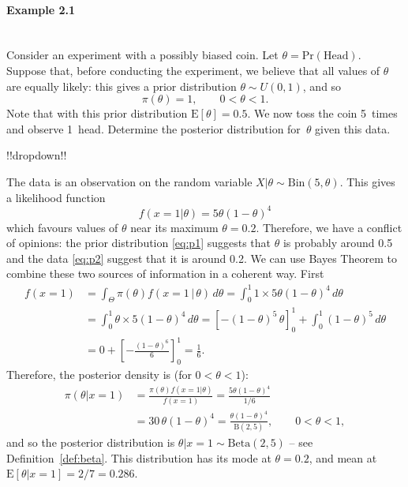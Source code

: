 \paragraph{Example 2.1}{~\\
Consider an experiment with a possibly biased coin. Let
\label{ex:coin}
$\theta=\text{Pr}(\mathrm{Head})$. Suppose that, before conducting the experiment, we believe that all values of $\theta$ are equally likely: this gives a prior distribution $\theta\sim U(0,1)$, and so
\begin{equation} 
\pi(\theta)=1,\quad\quad0<\theta<1.
\label{eq:p1}
\end{equation}
Note that with this prior distribution $\text{E}[\theta]=0.5$. We now toss the coin 5~times and observe 1~head. Determine the posterior distribution for~$\theta$ given this data.

!!dropdown!!

The data is an observation on the random variable $X|\theta\sim
        \mathrm{Bin}(5,\theta)$. This gives a likelihood function
        \begin{equation}
        f(x=1|\theta)=5\theta(1-\theta)^4
        \label{eq:p2}
        \end{equation}
        which favours values of $\theta$ near its maximum
        $\theta=0.2$. Therefore, we have a conflict of opinions: the prior
        distribution \eqref{eq:p1} suggests that $\theta$ is probably around
        0.5 and the data \eqref{eq:p2} suggest that it is around 0.2. We can
        use Bayes Theorem to combine these two sources of information in a
        coherent way. First
        \begin{align*}
        f(x=1) &=\int_\Theta\pi(\theta)f(x=1\, |\,\theta)\,d\theta = \int_0^1 1\times 5\theta(1-\theta)^4\,d\theta \\
        &=\int_0^1 \theta\times 5(1-\theta)^4\,d\theta =\left[-(1-\theta)^5\,\theta\right]^1_0
        +\int_0^1 (1-\theta)^5\,d\theta \\
        &=0 + \left[-\frac{(1-\theta)^6}{6}\right]^1_0 =\frac{1}{6}. 
        \end{align*}
        Therefore, the posterior density is (for $0<\theta<1$):
        \begin{align*}
        \pi(\theta|x=1)&=\frac{\pi(\theta)f(x=1|\theta)}{f(x=1)} =\frac{5\theta(1-\theta)^4}{1/6}\\
        &=30\,\theta(1-\theta)^4 =\frac{\theta(1-\theta)^4}{\mathrm{B}(2,5)},\quad\quad 0<\theta<1,
        \end{align*}
        and so the posterior distribution is $\theta|x=1\sim \mathrm{Beta}(2,5)$ -- see
        Definition~\ref{def:beta}.  This distribution has its mode at
        $\theta=0.2$, and mean at $\text{E}[\theta|x=1]=2/7=0.286$.

}
